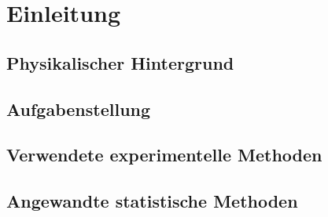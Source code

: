 \documentclass[../main.tex]{subfiles} %
\begin{document}
\chapter{Einleitung}\label{ch:einleitung}


    \section{Physikalischer Hintergrund}\label{sec:physikalischer-hintergrund}




    \section{Aufgabenstellung}\label{sec:aufgabenstellung}


    \section{Verwendete experimentelle Methoden}\label{sec:verwendete-experimentelle-methoden}


    \section{Angewandte statistische Methoden}\label{sec:angewandte-statistische-methoden}
\end{document}
